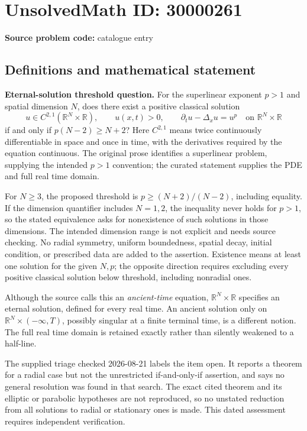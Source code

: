 \documentclass[11pt]{article}
\newcommand{\R}{\mathbb{R}}
\begin{document}
\section*{UnsolvedMath ID: 30000261}
\textbf{Source problem code:} catalogue entry
\subsection{Definitions and mathematical statement}
\textbf{Eternal-solution threshold question.} For the superlinear exponent \(p>1\) and spatial dimension \(N\), does there exist a positive classical solution\[u\in C^{2,1}(\R^N\times\R),\qquad u(x,t)>0,\qquad \partial_tu-\Delta_xu=u^p\quad\text{on }\R^N\times\R\] if and only if \(p(N-2)\ge N+2\)? Here \(C^{2,1}\) means twice continuously differentiable in space and once in time, with the derivatives required by the equation continuous. The original prose identifies a superlinear problem, supplying the intended \(p>1\) convention; the curated statement supplies the PDE and full real time domain.\par For \(N\ge3\), the proposed threshold is \(p\ge(N+2)/(N-2)\), including equality. If the dimension quantifier includes \(N=1,2\), the inequality never holds for \(p>1\), so the stated equivalence asks for nonexistence of such solutions in those dimensions. The intended dimension range is not explicit and needs source checking. No radial symmetry, uniform boundedness, spatial decay, initial condition, or prescribed data are added to the assertion. Existence means at least one solution for the given \(N,p\); the opposite direction requires excluding every positive classical solution below threshold, including nonradial ones.\par Although the source calls this an \emph{ancient-time} equation, \(\R^N\times\R\) specifies an eternal solution, defined for every real time. An ancient solution only on \(\R^N\times(-\infty,T)\), possibly singular at a finite terminal time, is a different notion. The full real time domain is retained exactly rather than silently weakened to a half-line.\par The supplied triage checked 2026-08-21 labels the item open. It reports a theorem for a radial case but not the unrestricted if-and-only-if assertion, and says no general resolution was found in that search. The exact cited theorem and its elliptic or parabolic hypotheses are not reproduced, so no unstated reduction from all solutions to radial or stationary ones is made. This dated assessment requires independent verification.
\end{document}
